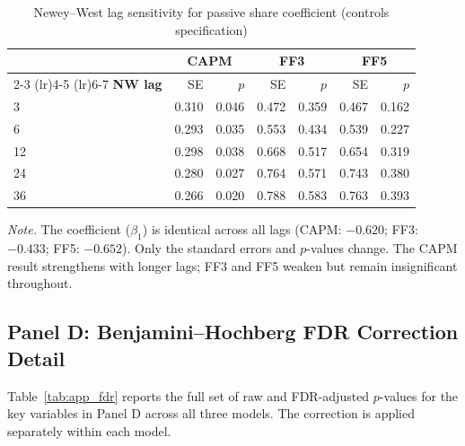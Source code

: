 \documentclass[11pt, a4paper]{article}
\begin{document}
\begin{table}[H]
\centering
\caption{Newey--West lag sensitivity for passive share coefficient (controls specification)}
\label{tab:app_nw}
\small
\begin{tabular}{lrrrrrr}
\toprule
 & \multicolumn{2}{c}{\textbf{CAPM}} & \multicolumn{2}{c}{\textbf{FF3}} & \multicolumn{2}{c}{\textbf{FF5}} \\
\cmidrule(lr){2-3} \cmidrule(lr){4-5} \cmidrule(lr){6-7}
\textbf{NW lag} & SE & $p$ & SE & $p$ & SE & $p$ \\
\midrule
3  & 0.310 & 0.046 & 0.472 & 0.359 & 0.467 & 0.162 \\
6  & 0.293 & 0.035 & 0.553 & 0.434 & 0.539 & 0.227 \\
12 & 0.298 & 0.038 & 0.668 & 0.517 & 0.654 & 0.319 \\
24 & 0.280 & 0.027 & 0.764 & 0.571 & 0.743 & 0.380 \\
36 & 0.266 & 0.020 & 0.788 & 0.583 & 0.763 & 0.393 \\
\bottomrule
\end{tabular}
\begin{flushleft}
\small\textit{Note.} The coefficient ($\beta_1$) is identical across all lags (CAPM: $-0.620$; FF3: $-0.433$; FF5: $-0.652$). Only the standard errors and $p$-values change. The CAPM result strengthens with longer lags; FF3 and FF5 weaken but remain insignificant throughout.
\end{flushleft}
\end{table}

\subsection{Panel D: Benjamini--Hochberg FDR Correction Detail}
\label{app:fdr_detail}

Table~\ref{tab:app_fdr} reports the full set of raw and FDR-adjusted $p$-values for the key variables in Panel D across all three models. The correction is applied separately within each model.
\end{document}
